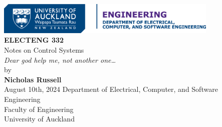 \begin{titlepage}
    \centering
    \includegraphics[width=0.8\textwidth]{images/DECSE-HC-4C-01.png}\\[1cm]
    {\LARGE \textbf{ELECTENG 332}}\\[0.5cm]
    {\Large Notes on Control Systems}\\[0.5cm]
    {\textit{Dear god help me, not another one\dots\ }}\\[2cm]
    {\large by}\\[0.3cm]
    {\large \textbf{Nicholas Russell}}\\[1.4cm]
    {\large August 10th, 2024}
    \vfill
    {\large Department of Electrical, Computer, and Software Engineering}\\[0.3cm]
    {\large Faculty of Engineering}\\[0.3cm]
    {\large University of Auckland}
\end{titlepage}
